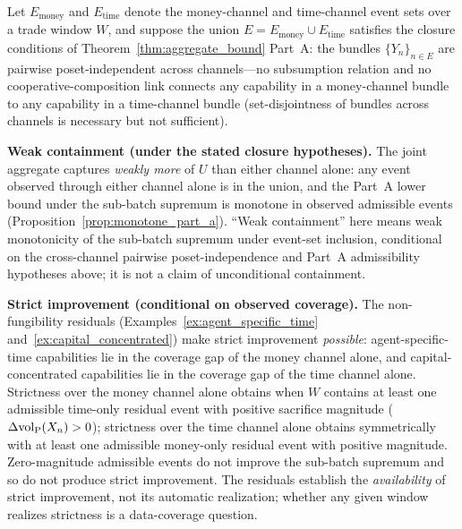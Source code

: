 \begin{corollary}
\label{cor:joint_coverage}
Let $E_{\mathrm{money}}$ and $E_{\mathrm{time}}$ denote the
money-channel and time-channel event sets over a trade window
$W$, and suppose the union $E = E_{\mathrm{money}} \cup
E_{\mathrm{time}}$ satisfies the closure conditions of
Theorem~\ref{thm:aggregate_bound} Part~A: the bundles
$\{Y_n\}_{n \in E}$ are pairwise poset-independent across
channels---no subsumption relation and no cooperative-composition
link connects any capability in a money-channel bundle to any
capability in a time-channel bundle (set-disjointness of
bundles across channels is necessary but not sufficient).

\medskip\noindent
\textbf{Weak containment (under the stated closure
hypotheses).}
The joint aggregate captures \emph{weakly more} of $U$ than
either channel alone: any event observed through either channel
alone is in the union, and the Part~A lower bound under the
sub-batch supremum is monotone in observed admissible events
(Proposition~\ref{prop:monotone_part_a}).  ``Weak containment''
here means weak monotonicity of the sub-batch supremum under
event-set inclusion, conditional on the cross-channel pairwise
poset-independence and Part~A admissibility hypotheses
above; it is not a claim of unconditional containment.

\medskip\noindent
\textbf{Strict improvement (conditional on observed coverage).}
The non-fungibility residuals
(Examples~\ref{ex:agent_specific_time}
and~\ref{ex:capital_concentrated}) make strict improvement
\emph{possible}: agent-specific-time capabilities lie in the
coverage gap of the money channel alone, and
capital-concentrated capabilities lie in the coverage gap of the
time channel alone.  Strictness over the money channel alone
obtains when $W$ contains at least one admissible time-only
residual event with positive sacrifice magnitude
($\Delta{\operatorname{vol}_{\mathrm{P}}}(X_n) > 0$); strictness over the time channel
alone obtains symmetrically with at least one admissible
money-only residual event with positive magnitude.  Zero-magnitude
admissible events do not improve the sub-batch supremum and so
do not produce strict improvement.  The residuals establish the \emph{availability} of
strict improvement, not its automatic realization; whether any
given window realizes strictness is a data-coverage question.
\end{corollary}

